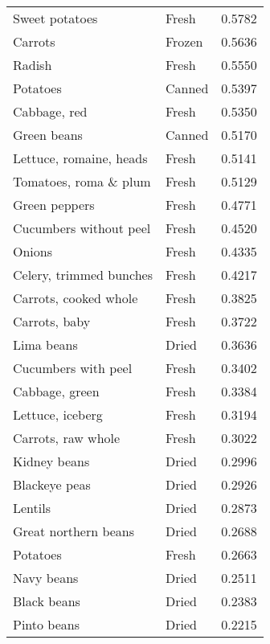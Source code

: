 \documentclass[
]{article}
\begin{document}
\begin{longtable}[t]{llr}
Sweet potatoes & Fresh & 0.5782\\
Carrots & Frozen & 0.5636\\
Radish & Fresh & 0.5550\\
Potatoes & Canned & 0.5397\\
\addlinespace
Cabbage, red & Fresh & 0.5350\\
Green beans & Canned & 0.5170\\
Lettuce, romaine, heads & Fresh & 0.5141\\
Tomatoes, roma \& plum & Fresh & 0.5129\\
Green peppers & Fresh & 0.4771\\
\addlinespace
Cucumbers without peel & Fresh & 0.4520\\
Onions & Fresh & 0.4335\\
Celery, trimmed bunches & Fresh & 0.4217\\
Carrots, cooked whole & Fresh & 0.3825\\
Carrots, baby & Fresh & 0.3722\\
\addlinespace
Lima beans & Dried & 0.3636\\
Cucumbers with peel & Fresh & 0.3402\\
Cabbage, green & Fresh & 0.3384\\
Lettuce, iceberg & Fresh & 0.3194\\
Carrots, raw whole & Fresh & 0.3022\\
\addlinespace
Kidney beans & Dried & 0.2996\\
Blackeye peas & Dried & 0.2926\\
Lentils & Dried & 0.2873\\
Great northern beans & Dried & 0.2688\\
Potatoes & Fresh & 0.2663\\
\addlinespace
Navy beans & Dried & 0.2511\\
Black beans & Dried & 0.2383\\
Pinto beans & Dried & 0.2215\\
\bottomrule
\end{longtable}
\end{document}
